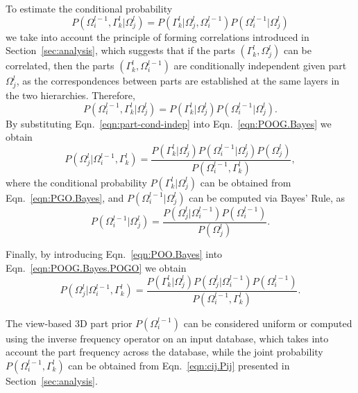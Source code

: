 \documentclass[conference]{IEEEtran}
\begin{document}
To estimate the conditional probability
\begin{equation}
 P(\Omega_i^{l-1},\Gamma_k^l \vert \Omega_j^{l}) =  P(\Gamma_k^l \vert \Omega_j^{l},\Omega_i^{l-1}) P(\Omega_i^{l-1} \vert \Omega_j^{l})
\end{equation}
we take into account the principle of forming correlations introduced in Section~\ref{sec:analysis}, which suggests that if the parts $(\Gamma_k^l,\Omega_j^{l})$ can be correlated, then the parts $(\Gamma_k^l,\Omega_i^{l-1})$ are conditionally independent given part $\Omega_j^{l}$, as the correspondences between parts are established at the same layers in the two hierarchies. Therefore,
\begin{equation}
  P(\Omega_i^{l-1},\Gamma_k^l \vert \Omega_j^{l}) =  P(\Gamma_k^l \vert \Omega_j^{l}) P(\Omega_i^{l-1} \vert \Omega_j^{l}).
  \label{eqn:part-cond-indep}
\end{equation}
By substituting Eqn.~\ref{eqn:part-cond-indep} into Eqn.~\ref{eqn:POOG.Bayes} we obtain
\begin{equation}
  P(\Omega_j^{l} \vert \Omega_i^{l-1},\Gamma_k^l) = \frac{P(\Gamma_k^l \vert \Omega_j^{l})P(\Omega_i^{l-1} \vert \Omega_j^{l})P(\Omega_j^{l})}{P(\Omega_i^{l-1},\Gamma_k^l)},
  \label{eqn:POOG.Bayes.POGO}
\end{equation}
where the conditional probability $P(\Gamma_k^l \vert \Omega_j^l)$ can be obtained from Eqn.~\ref{eqn:PGO.Bayes}, and $P(\Omega_i^{l-1} \vert \Omega_j^{l})$ can be computed via Bayes' Rule, as
\begin{equation}
  P(\Omega_i^{l-1} \vert \Omega_j^{l}) = \frac{P(\Omega_j^{l}\vert \Omega_i^{l-1})P(\Omega_i^{l-1})}{P(\Omega_j^{l})}.
  \label{eqn:POO.Bayes}
 \end{equation}

Finally, by introducing Eqn.~\ref{eqn:POO.Bayes} into Eqn.~\ref{eqn:POOG.Bayes.POGO} we obtain
\begin{equation}
 P(\Omega_j^{l} \vert \Omega_i^{l-1},\Gamma_k^l) = \frac{P(\Gamma_k^l \vert \Omega_j^{l})P(\Omega_j^{l} \vert \Omega_i^{l-1})P(\Omega_i^{l-1})}{P(\Omega_i^{l-1},\Gamma_k^l)}.
\end{equation}
  
The view-based 3D part prior $P(\Omega_i^{l-1})$ can be considered uniform or computed using the inverse frequency operator on an input database, which takes into account the part frequency across the database, while the joint probability $P(\Omega_i^{l-1},\Gamma_k^l)$ can be obtained from Eqn.~\ref{eqn:cij.Pij} presented in Section~\ref{sec:analysis}.
\end{document}
